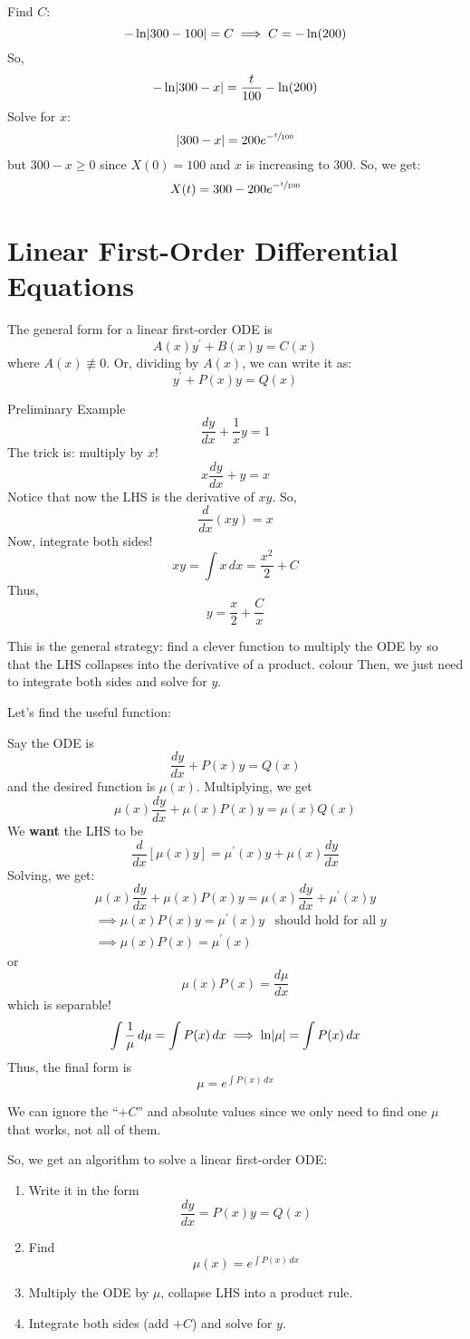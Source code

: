 Find $ C $: \[ -\ln\lvert300-100\rvert=C\implies C=-\ln(200) \]
So,
\[ -\ln\lvert300-x\rvert=\frac{t}{100}-\ln(200) \]
Solve for $ x $:
\[ \lvert300-x\rvert=200e^{-\sfrac{t}{100}} \]
but $ 300-x\geqslant 0 $ since $ X(0)=100 $ and $ x $ is increasing
to 300. So, we get:
\[ X(t)=300-200e^{-\sfrac{t}{100}} \]

\section{Linear First-Order Differential Equations}
The general form for a linear first-order ODE is
\[ A(x)y^\prime+B(x)y=C(x) \]
where $ A(x)\not\equiv 0 $. Or, dividing by $ A(x) $, we can write it as:
\[ y^\prime+P(x)y=Q(x) \]
\begin{Example}{Preliminary Example}{}
    \[ \frac{dy}{dx} +\frac{1}{x} y=1 \]
    The trick is: multiply by $ x $!
    \[ x \frac{dy}{dx} +y=x \]
    Notice that now the LHS is the derivative of $ xy $. So,
    \[ \frac{d}{dx} (xy)=x \]
    Now, integrate both sides!
    \[ xy=\int x\, d{x}=\frac{x^2}{2} +C \]
    Thus,
    \[ y=\frac{x}{2} +\frac{C}{x} \]
\end{Example}
This is the general strategy: find a clever function to multiply
the ODE by so that the LHS collapses into the derivative of a product.
colour
Then, we just need to integrate both sides and solve for $ y $.

Let's find the useful function:

Say the ODE is
\[ \frac{dy}{dx} +P(x)y=Q(x) \]
and the desired function is $ \mu(x) $. Multiplying, we get
\[ \mu(x)\frac{dy}{dx} +\mu(x)P(x)y=\mu(x)Q(x) \]
We \textbf{want} the LHS to be
\[ \frac{d}{dx} \left[ \mu(x)y \right]=\mu^\prime(x)y+\mu(x)\frac{dy}{dx}  \]
Solving, we get:
\[ \mu(x)\frac{dy}{dx} +\mu(x)P(x)y=\mu(x)\frac{dy}{dx}+\mu^\prime(x)y \]
\begin{align*}
     & \implies \mu(x)P(x)y=\mu^\prime(x)y & \text{should hold for all } y \\
     & \implies \mu(x)P(x)=\mu^\prime(x)
\end{align*}
or
\[ \mu(x)P(x)=\frac{d\mu}{dx}  \]
which is separable!
\[ \int \frac{1}{\mu} \, d{\mu} =\int P(x)\, d{x}\implies \ln\lvert\mu\rvert=\int P(x)\, d{x} \]
Thus, the final form is
\[ \mu=e^{\int P(x)\, d{x}} \]
\begin{Remark}{}{}
    We can ignore the ``$ +C $'' and absolute values since we only need to find one $ \mu $
    that works, not all of them.
\end{Remark}
So, we get an algorithm to solve a linear first-order ODE\@:
\begin{enumerate}
    \item Write it in the form
          \[ \frac{dy}{dx}=P(x)y=Q(x) \]
    \item Find
          \[ \mu(x)=e^{\int P(x)\, d{x}} \]
    \item Multiply the ODE by $ \mu $, collapse LHS into a product rule.
    \item Integrate both sides (add $ +C $) and solve for $ y $.
\end{enumerate}

